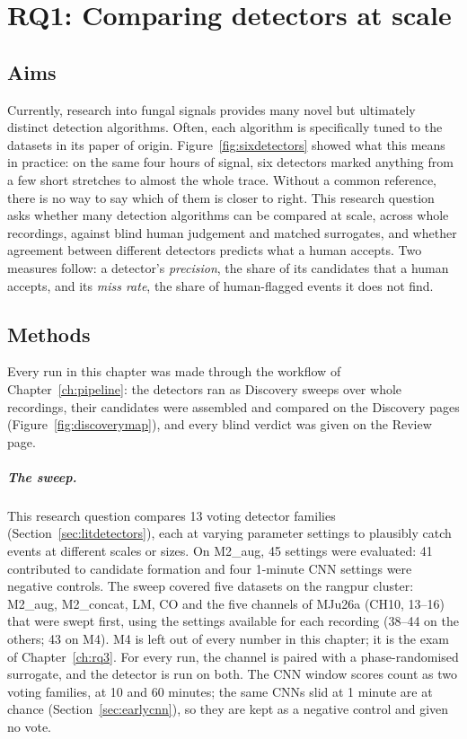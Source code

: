 \chapter{RQ1: Comparing detectors at scale}
\label{ch:rq1}

\section{Aims}

Currently, research into fungal signals provides many novel but ultimately distinct detection algorithms. Often, each algorithm is specifically tuned to the datasets in its paper of origin. Figure~\ref{fig:sixdetectors} showed what this means in practice: on the same four hours of signal, six detectors marked anything from a few short stretches to almost the whole trace. Without a common reference, there is no way to say which of them is closer to right. This research question asks whether many detection algorithms can be compared at scale, across whole recordings, against blind human judgement and matched surrogates, and whether agreement between different detectors predicts what a human accepts. Two measures follow: a detector's \emph{precision}, the share of its candidates that a human accepts, and its \emph{miss rate}, the share of human-flagged events it does not find.

\section{Methods}
\label{sec:rq1methods}

Every run in this chapter was made through the \tool{} workflow of Chapter~\ref{ch:pipeline}: the detectors ran as Discovery sweeps over whole recordings, their candidates were assembled and compared on the Discovery pages (Figure~\ref{fig:discoverymap}), and every blind verdict was given on the Review page.

\paragraph{The sweep.} This research question compares 13 voting detector families (Section~\ref{sec:litdetectors}), each at varying parameter settings to plausibly catch events at different scales or sizes. On M2\_aug, 45 settings were evaluated: 41 contributed to candidate formation and four 1-minute CNN settings were negative controls. The sweep covered five datasets on the rangpur cluster: M2\_aug, M2\_concat, LM, CO and the five channels of MJu26a (CH10, 13--16) that were swept first, using the settings available for each recording (38--44 on the others; 43 on M4). M4 is left out of every number in this chapter; it is the exam of Chapter~\ref{ch:rq3}. For every run, the channel is paired with a phase-randomised surrogate, and the detector is run on both. The CNN window scores count as two voting families, at 10 and 60 minutes; the same CNNs slid at 1 minute are at chance (Section~\ref{sec:earlycnn}), so they are kept as a negative control and given no vote.

